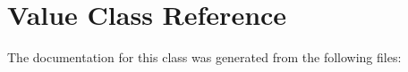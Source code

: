 \hypertarget{classstatic_01const_01Token_1_1Value}{}\section{Value Class Reference}
\label{classstatic_01const_01Token_1_1Value}


The documentation for this class was generated from the following files\+: